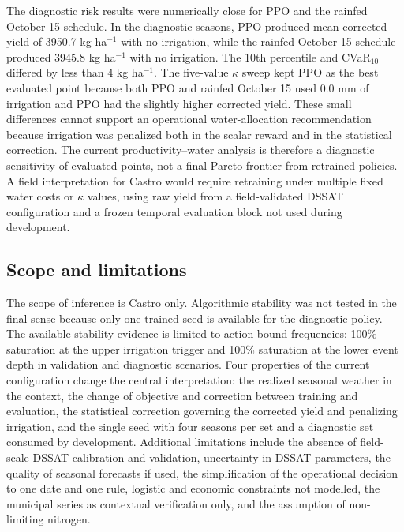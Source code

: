 \documentclass[times,final,authoryear]{elsarticle}
\begin{document}
The diagnostic risk results were numerically close for PPO and the rainfed October 15 schedule. In the diagnostic seasons, PPO produced mean corrected yield of 3950.7 kg ha$^{-1}$ with no irrigation, while the rainfed October 15 schedule produced 3945.8 kg ha$^{-1}$ with no irrigation. The 10th percentile and CVaR$_{10}$ differed by less than 4 kg ha$^{-1}$. The five-value $\kappa$ sweep kept PPO as the best evaluated point because both PPO and rainfed October 15 used 0.0 mm of irrigation and PPO had the slightly higher corrected yield. These small differences cannot support an operational water-allocation recommendation because irrigation was penalized both in the scalar reward and in the statistical correction. The current productivity--water analysis is therefore a diagnostic sensitivity of evaluated points, not a final Pareto frontier from retrained policies. A field interpretation for Castro would require retraining under multiple fixed water costs or $\kappa$ values, using raw yield from a field-validated DSSAT configuration and a frozen temporal evaluation block not used during development.

\subsection{Scope and limitations}
\label{subdisc_limitations}

The scope of inference is Castro only. Algorithmic stability was not tested in the final sense because only one trained seed is available for the diagnostic policy. The available stability evidence is limited to action-bound frequencies: 100\% saturation at the upper irrigation trigger and 100\% saturation at the lower event depth in validation and diagnostic scenarios. Four properties of the current configuration change the central interpretation: the realized seasonal weather in the context, the change of objective and correction between training and evaluation, the statistical correction governing the corrected yield and penalizing irrigation, and the single seed with four seasons per set and a diagnostic set consumed by development. Additional limitations include the absence of field-scale DSSAT calibration and validation, uncertainty in DSSAT parameters, the quality of seasonal forecasts if used, the simplification of the operational decision to one date and one rule, logistic and economic constraints not modelled, the municipal series as contextual verification only, and the assumption of non-limiting nitrogen.
\end{document}
